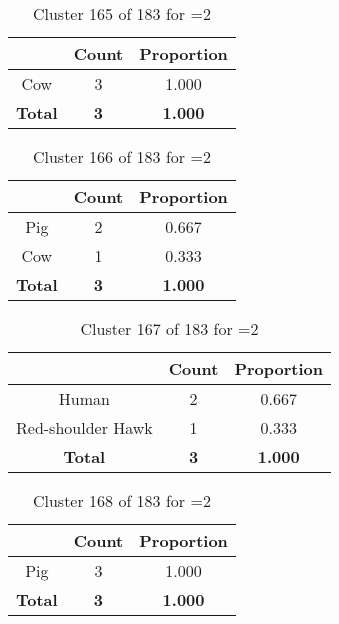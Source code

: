 \begin{table}[ht!]
\centering
\begin{tabular}{|c|c|c|}
\hline
\bf \Spec{} &\bf Count &\bf Proportion\\ \hline \hline
Cow & 3 & 1.000\\ \hline
\hline
\bf Total & \bf 3 & \bf 1.000\\ \hline
\end{tabular}
\label{tab:cluster:165:2}
\caption{Cluster 165 of 183 for \minneigh{}=2}
\end{table}

\begin{table}[ht!]
\centering
\begin{tabular}{|c|c|c|}
\hline
\bf \Spec{} &\bf Count &\bf Proportion\\ \hline \hline
Pig & 2 & 0.667\\ \hline
Cow & 1 & 0.333\\ \hline
\hline
\bf Total & \bf 3 & \bf 1.000\\ \hline
\end{tabular}
\label{tab:cluster:166:2}
\caption{Cluster 166 of 183 for \minneigh{}=2}
\end{table}

\begin{table}[ht!]
\centering
\begin{tabular}{|c|c|c|}
\hline
\bf \Spec{} &\bf Count &\bf Proportion\\ \hline \hline
Human & 2 & 0.667\\ \hline
Red-shoulder Hawk & 1 & 0.333\\ \hline
\hline
\bf Total & \bf 3 & \bf 1.000\\ \hline
\end{tabular}
\label{tab:cluster:167:2}
\caption{Cluster 167 of 183 for \minneigh{}=2}
\end{table}

\begin{table}[ht!]
\centering
\begin{tabular}{|c|c|c|}
\hline
\bf \Spec{} &\bf Count &\bf Proportion\\ \hline \hline
Pig & 3 & 1.000\\ \hline
\hline
\bf Total & \bf 3 & \bf 1.000\\ \hline
\end{tabular}
\label{tab:cluster:168:2}
\caption{Cluster 168 of 183 for \minneigh{}=2}
\end{table}

